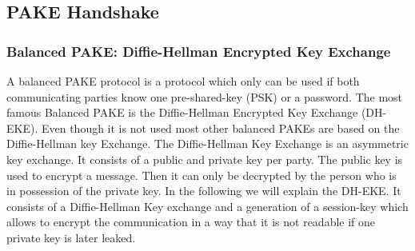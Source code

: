 \documentclass[journal]{IEEEtran}
\begin{document}
\subsection{PAKE Handshake}
\subsubsection{Balanced PAKE: Diffie-Hellman Encrypted Key Exchange}
    A balanced PAKE protocol is a protocol which only can be used if both communicating parties know one pre-shared-key (PSK) or a password.
    The most famous Balanced PAKE is the Diffie-Hellman Encrypted Key Exchange (DH-EKE). Even though it is not used most other balanced PAKEs are based on the Diffie-Hellman key Exchange.
    The Diffie-Hellman Key Exchange is an asymmetric key exchange. It consists of a public and private key per party. The public key is used to encrypt a message. \cite{mitra2021prevention}
    Then it can only be decrypted by the person who is in possession of the private key.
    In the following we will explain the DH-EKE. \cite{chang2022jpake} It consists of a Diffie-Hellman Key exchange and a generation of a session-key which allows to encrypt the communication in a way that it is not readable if one private key is later leaked.
    
\end{document}
